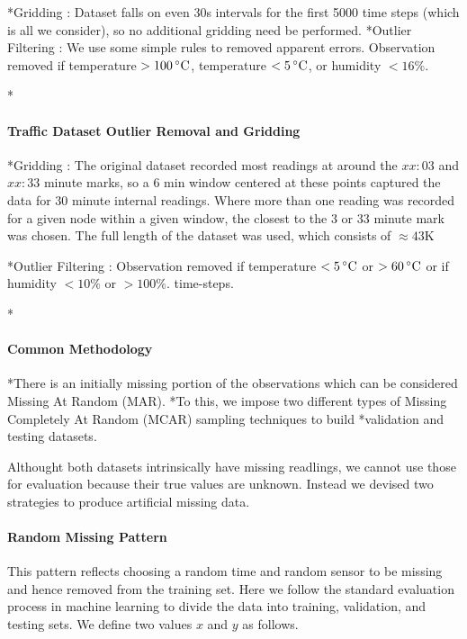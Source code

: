 *Gridding : Dataset falls on even 30s intervals for the first 5000 time steps (which is all we consider), so no additional gridding need be performed.
*Outlier Filtering : We use some simple rules to removed apparent errors. Observation removed if temperature \mbox{$>100\,^{\circ}\mathrm{C}$}, temperature \mbox{$<5\,^{\circ}\mathrm{C}$}, or humidity \mbox{$<16\%$}.

*\paragraph*{Traffic Dataset Outlier Removal and Gridding}


*Gridding : The original dataset recorded most readings at around the $xx:03$ and $xx:33$ minute marks, so a $6$ min window centered at these points captured the data for $30$ minute internal readings. Where more than one reading was recorded for a given node within a given window, the closest to the $3$ or $33$ minute mark was chosen. The full length of the dataset was used, which consists of $\approx 43$K 

*Outlier Filtering : Observation removed if temperature \mbox{$<5\,^{\circ}\mathrm{C}$} or \mbox{$>60\,^{\circ}\mathrm{C}$} or if humidity \mbox{$<10\%$} or \mbox{$>100\%$}.
time-steps.

*\paragraph*{Common Methodology}

*There is an initially missing portion of the observations which can be considered Missing At Random (MAR).
*To this, we impose two different types of Missing Completely At Random (MCAR) sampling techniques to build *validation and testing datasets.

Althought both datasets intrinsically have missing readlings, we cannot use those for evaluation because their true values are unknown. Instead we devised two strategies to produce artificial missing data.
\paragraph*{Random Missing Pattern}

This pattern reflects choosing a random time and random sensor to be missing and hence removed from the training set. Here we follow the standard evaluation process in machine learning to divide the data into training, validation, and testing sets.
We define two values $x$ and $y$ as follows.


